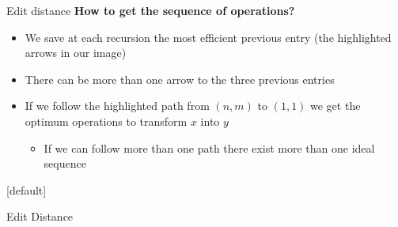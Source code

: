 \begin{frame}{Edit distance}
  \textbf{How to get the sequence of operations?}
  \begin{itemize}
    \item<2->
      We save at each recursion the most efficient previous entry
      (the {\color{MainA}highlighted arrows} in our image)
    \item<3->
      There can be {\color{MainA}more than one} arrow to the three
      previous entries
    \item<4->
      If we follow the highlighted path from {\color{MainA}$(n, m)$} to
      {\color{MainA}$(1, 1)$} we get the optimum operations to transform
      {\color{MainA}$x$} into {\color{MainA}$y$}
      \begin{itemize}
        \item<5->
          If we can follow {\color{MainA}more than one path} there exist
          more than one ideal {\color{MainA}sequence}
      \end{itemize}
  \end{itemize}
\end{frame}


{%
  [default]
  \makeatletter\def\beamer@entrycode{\vspace*{-\headheight}}\makeatother
  \begin{frame}{Edit Distance}
    \begin{center}
      \begin{adjustbox}{width=0.8\linewidth}
        \def\AlgoIntro{0}\def\AlgoFinal{1}%
        
      \end{adjustbox}
    \end{center}
  \end{frame}
}%


